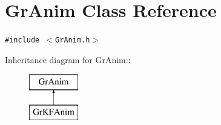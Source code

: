 \hypertarget{class_gr_anim}{
\section{GrAnim Class Reference}
\label{class_gr_anim}
}
{\tt \#include $<$GrAnim.h$>$}

Inheritance diagram for GrAnim::\begin{figure}[H]
\begin{center}
\leavevmode
\includegraphics[height=2cm]{class_gr_anim}
\end{center}
\end{figure}
